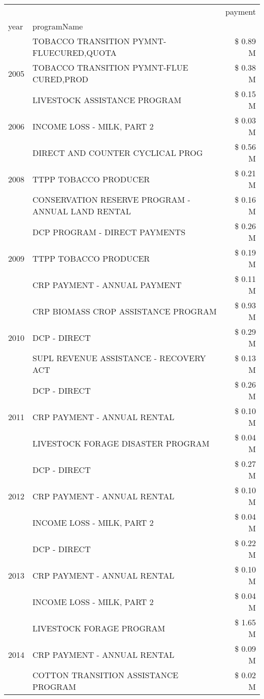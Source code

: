\begin{tabular}{llr}
\toprule
 &  & payment \\
year & programName &  \\
\midrule
\multirow[t]{3}{*}{2005} & TOBACCO TRANSITION PYMNT-FLUECURED,QUOTA & \$ 0.89 M \\
 & TOBACCO TRANSITION PYMNT-FLUE CURED,PROD & \$ 0.38 M \\
 & LIVESTOCK ASSISTANCE PROGRAM & \$ 0.15 M \\
\cline{1-3}
2006 & INCOME LOSS - MILK, PART 2 & \$ 0.03 M \\
\cline{1-3}
\multirow[t]{3}{*}{2008} & DIRECT AND COUNTER CYCLICAL PROG & \$ 0.56 M \\
 & TTPP TOBACCO PRODUCER & \$ 0.21 M \\
 & CONSERVATION RESERVE PROGRAM - ANNUAL LAND RENTAL & \$ 0.16 M \\
\cline{1-3}
\multirow[t]{3}{*}{2009} & DCP PROGRAM - DIRECT PAYMENTS & \$ 0.26 M \\
 & TTPP TOBACCO PRODUCER & \$ 0.19 M \\
 & CRP PAYMENT - ANNUAL PAYMENT & \$ 0.11 M \\
\cline{1-3}
\multirow[t]{3}{*}{2010} & CRP BIOMASS CROP ASSISTANCE PROGRAM & \$ 0.93 M \\
 & DCP - DIRECT & \$ 0.29 M \\
 & SUPL REVENUE ASSISTANCE - RECOVERY ACT & \$ 0.13 M \\
\cline{1-3}
\multirow[t]{3}{*}{2011} & DCP - DIRECT & \$ 0.26 M \\
 & CRP PAYMENT - ANNUAL RENTAL & \$ 0.10 M \\
 & LIVESTOCK FORAGE DISASTER PROGRAM & \$ 0.04 M \\
\cline{1-3}
\multirow[t]{3}{*}{2012} & DCP - DIRECT & \$ 0.27 M \\
 & CRP PAYMENT - ANNUAL RENTAL & \$ 0.10 M \\
 & INCOME LOSS - MILK, PART 2 & \$ 0.04 M \\
\cline{1-3}
\multirow[t]{3}{*}{2013} & DCP - DIRECT & \$ 0.22 M \\
 & CRP PAYMENT - ANNUAL RENTAL & \$ 0.10 M \\
 & INCOME LOSS - MILK, PART 2 & \$ 0.04 M \\
\cline{1-3}
\multirow[t]{3}{*}{2014} & LIVESTOCK FORAGE PROGRAM & \$ 1.65 M \\
 & CRP PAYMENT - ANNUAL RENTAL & \$ 0.09 M \\
 & COTTON TRANSITION ASSISTANCE PROGRAM & \$ 0.02 M \\

\end{tabular}
